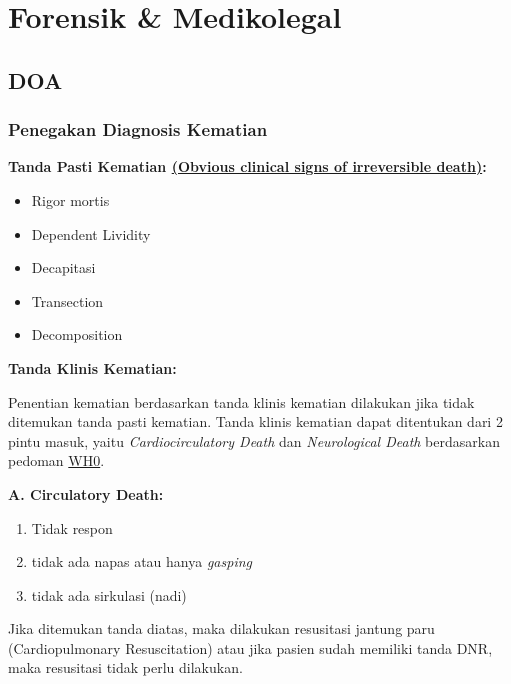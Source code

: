 \documentclass[
]{book}
\begin{document}
\hypertarget{forensik-medikolegal}{%
\section{Forensik \& Medikolegal}\label{forensik-medikolegal}}

\hypertarget{doa-1}{%
\subsection{DOA}\label{doa-1}}

\hypertarget{penegakan-diagnosis-kematian}{%
\subsubsection{Penegakan Diagnosis Kematian}\label{penegakan-diagnosis-kematian}}

\textbf{Tanda Pasti Kematian \href{https://www.ahajournals.org/doi/full/10.1161/circulationaha.110.970905}{(Obvious clinical signs of irreversible death)}:}

\begin{itemize}
\item
  Rigor mortis
\item
  Dependent Lividity
\item
  Decapitasi
\item
  Transection
\item
  Decomposition
\end{itemize}

\textbf{Tanda Klinis Kematian:}

Penentian kematian berdasarkan tanda klinis kematian dilakukan jika tidak ditemukan tanda pasti kematian. Tanda klinis kematian dapat ditentukan dari 2 pintu masuk, yaitu \emph{Cardiocirculatory Death} dan \emph{Neurological Death} berdasarkan pedoman \href{https://apps.who.int/iris/bitstream/handle/10665/254737/WHO-HIS-SDS-2017.5-eng.pdf;jsessionid=623C97B75CD26431B5E4D548292B5AB4?sequence=1}{WH0}.

\textbf{A. Circulatory Death:}

\begin{enumerate}
\def\labelenumi{\arabic{enumi}.}
\item
  Tidak respon
\item
  tidak ada napas atau hanya \emph{gasping}
\item
  tidak ada sirkulasi (nadi)
\end{enumerate}

Jika ditemukan tanda diatas, maka dilakukan resusitasi jantung paru (Cardiopulmonary Resuscitation) atau jika pasien sudah memiliki tanda DNR, maka resusitasi tidak perlu dilakukan.
\end{document}
